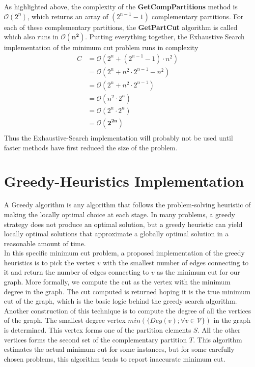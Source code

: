 \documentclass[longpaper, english, final, times]{revdetua}
\begin{document}
			As highlighted above, the complexity of the \textbf{GetCompPartitions} method is $\mathcal{O}(2^n)$, which returns an array of $(2^{n-1}-1)$ complementary partitions. For each of these complementary partitions, the \textbf{GetPartCut} algorithm is called which also runs in $\mathbf{\mathcal{O}(n^2)}$. Putting everything together, the Exhaustive Search implementation of the minimum cut problem runs in complexity
			\begin{align*}
				C & = \mathcal{O}\left(2^n + (2^{n-1}-1)\cdot n^2\right) \\
				& = \mathcal{O}\left(2^n + n^2\cdot 2^{n-1} - n^2\right) \\
				& = \mathcal{O}\left(2^n + n^2\cdot 2^{n-1}\right) \\
				& = \mathcal{O}\left(n^2\cdot 2^{n}\right)\\
				& = \mathcal{O}\left(2^n\cdot 2^{n}\right)\\
				& = \mathbf{\mathcal{O}\left(2^{2n}\right)} \\
			\end{align*}
			Thus the Exhaustive-Search implementation will probably not be used until faster methods have first reduced the size of the problem.
		
	\section{Greedy-Heuristics Implementation}
		A Greedy algorithm is any algorithm that follows the problem-solving heuristic of making the locally optimal choice at each stage.\cite{black2012greedy} In many problems, a greedy strategy does not produce an optimal solution, but a greedy heuristic can yield locally optimal solutions that approximate a globally optimal solution in a reasonable amount of time.\\
		
		In this specific minimum cut problem, a proposed implementation of the greedy heuristics is to pick the vertex $v$ with the smallest number of edges connecting to it and return the number of edges connecting to $v$ as the minimum cut for our graph. More formally, we compute the cut as the vertex with the minimum degree in the graph. The cut computed is returned hoping it is the true minimum cut of the graph, which is the basic logic behind the greedy search algorithm. Another construction of this technique is to compute the degree of all the vertices of the graph. The smallest degree vertex $min(\{Deg(v); \forall v \in \mathcal{V}\})$ in the graph is determined. This vertex forms one of the partition elements $S$. All the other vertices forms the second set of the complementary partition $T$. This algorithm estimates the actual minimum cut for some instances, but for some carefully chosen problems, this algorithm tends to report inaccurate minimum cut.\\
		
\end{document}
